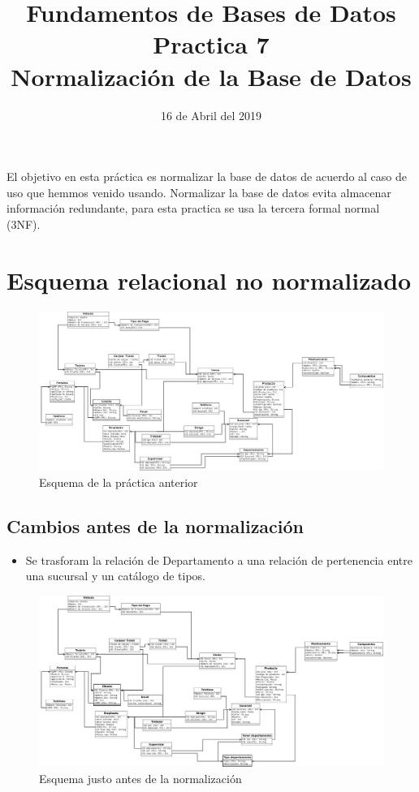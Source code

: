 \documentclass[10pt]{article}
\begin{document}
	
	\title{Fundamentos de Bases de Datos \\
		Practica 7\\ Normalización de la Base de Datos
	} 
	\author{}
	\date{16 de Abril del 2019}
	\maketitle
	

El objetivo en esta práctica es normalizar la base de datos de acuerdo al caso 
de uso que hemmos venido usando. Normalizar la base de datos evita almacenar 
información redundante,  para esta practica se usa la tercera formal normal (3NF).

\section{Esquema relacional no normalizado}

\begin{figure}[H]
	\centering
	\includegraphics[scale=0.2 ]{practica05.jpeg}
	\caption{Esquema de la práctica anterior}
	\label{fg:esqA}
\end{figure}

\subsection{Cambios antes de la normalización}
\begin{itemize}
	\item Se trasforam la relación de Departamento a una relación de pertenencia
	entre una sucursal y un catálogo de tipos.
\end{itemize}

\begin{figure}[H]
	\centering
	\includegraphics[scale=0.2 ]{practica07.jpeg}
	\caption{Esquema justo antes de la normalización}
	\label{fg:esNN}
\end{figure}
\end{document}
